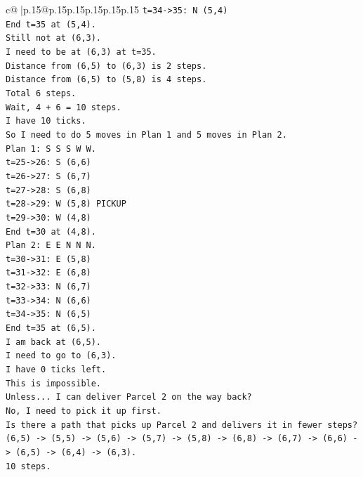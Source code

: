 \documentclass{article}
\begin{document}
{\begin{supertabular}{c@{$\;$}|p{.15\linewidth}@{}p{.15\linewidth}p{.15\linewidth}p{.15\linewidth}p{.15\linewidth}p{.15\linewidth}}
{{{\texttt{t=34{-}>35: N (5,4)} \\
\texttt{End t=35 at (5,4).} \\
\texttt{Still not at (6,3).} \\
\texttt{I need to be at (6,3) at t=35.} \\
\texttt{Distance from (6,5) to (6,3) is 2 steps.} \\
\texttt{Distance from (6,5) to (5,8) is 4 steps.} \\
\texttt{Total 6 steps.} \\
\texttt{Wait, 4 + 6 = 10 steps.} \\
\texttt{I have 10 ticks.} \\
\texttt{So I need to do 5 moves in Plan 1 and 5 moves in Plan 2.} \\
\texttt{Plan 1: S S S W W.} \\
\texttt{t=25{-}>26: S (6,6)} \\
\texttt{t=26{-}>27: S (6,7)} \\
\texttt{t=27{-}>28: S (6,8)} \\
\texttt{t=28{-}>29: W (5,8) PICKUP} \\
\texttt{t=29{-}>30: W (4,8)} \\
\texttt{End t=30 at (4,8).} \\
\texttt{Plan 2: E E N N N.} \\
\texttt{t=30{-}>31: E (5,8)} \\
\texttt{t=31{-}>32: E (6,8)} \\
\texttt{t=32{-}>33: N (6,7)} \\
\texttt{t=33{-}>34: N (6,6)} \\
\texttt{t=34{-}>35: N (6,5)} \\
\texttt{End t=35 at (6,5).} \\
\texttt{I am back at (6,5).} \\
\texttt{I need to go to (6,3).} \\
\texttt{I have 0 ticks left.} \\
\texttt{This is impossible.} \\
\texttt{Unless... I can deliver Parcel 2 on the way back?} \\
\texttt{No, I need to pick it up first.} \\
\texttt{Is there a path that picks up Parcel 2 and delivers it in fewer steps?} \\
\texttt{(6,5) {-}> (5,5) {-}> (5,6) {-}> (5,7) {-}> (5,8) {-}> (6,8) {-}> (6,7) {-}> (6,6) {-}> (6,5) {-}> (6,4) {-}> (6,3).} \\
\texttt{10 steps.} \\
}}}
\end{supertabular}}
\end{document}
